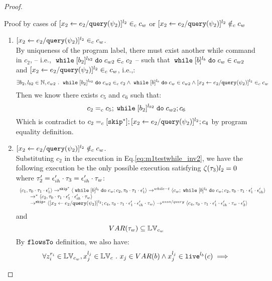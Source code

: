 \begin{proof}
\begin{case}
\begin{subcase}
\begin{subsubcase}
\begin{subproof}
%
Proof by cases of $[\mathrel{ {x}_2 \leftarrow e_2 / {\tt query}(\psi_2) }]^{l_2} \in_c c_w$ or 
$[\mathrel{ {x}_2 \leftarrow e_2 / {\tt query}(\psi_2) }]^{l_2} \notin_c c_w$
\begin{enumerate}
  \item $[\mathrel{ {x}_2 \leftarrow e_2 / {\tt query}(\psi_2) }]^{l_2} \in_c c_w$.
  \\
  By uniqueness of the program label, there must exist another while command in $c_2$, -- i.e., $\;\mathtt{while}\; [b_2]^{l_{b2}} \;\mathtt{do}\; c_{w2} \in_c c_2$ --
    such that 
  $\;\mathtt{while}\; [b]^{l_b} \;\mathtt{do}\; c_w \in c_{w2}$ and $[\mathrel{ {x}_2 \leftarrow e_2 / {\tt query}(\psi_2) }]^{l_2} \in_c c_w$, i.e.,:
  \[
  \exists b_2, l_{b2} \in \mathbb{N}, c_{w2} ~.~ 
  \;\mathtt{while}\; [b_2]^{l_{b2}} \;\mathtt{do}\; c_{w2} \in_c c_2 
  \land \;\mathtt{while}\; [b]^{l_b} \;\mathtt{do}\; c_w \in c_{w2}
  \land [\mathrel{ {x}_2 \leftarrow e_2 / {\tt query}(\psi_2) }]^{l_2} \in_c c_w
  \]
%
Then we know there exists $c_5$ and $c_6$ such that:
\[
  c_2 =_c c_5; \;\mathtt{while}\; [b_2]^{l_{b2}} \;\mathtt{do}\; c_{w2};c_6
\]
Which is contradict to $c_2 =_c [\mathtt{skip}^*];[\mathrel{ {x}_2 \leftarrow e_2 / {\tt query}(\psi_2) }]^{l_2};{c}_4$ by program equality definition.
%
%
 \item $[\mathrel{ {x}_2 \leftarrow e_2 / {\tt query}(\psi_2) }]^{l_2} \notin_c c_w$.
%
\\
%
Substituting $c_2$ in the execution in Eq.\ref{eq:m1testwhile_inv2}, we have the following execution be the only possible execution satisfying $\mathtt{\zeta}(\mathtt{\tau}_3) l_2 = 0$ where $\mathtt{\tau}_2' = \mathtt{\epsilon}_{ih}' \cdot \mathtt{\tau}_3 = \mathtt{\epsilon}_{ih}' \cdot \mathtt{\tau}_w$:
\[
    \begin{array}{l}   
  \langle c_1, \mathtt{\tau}_0 \cdot \mathtt{\tau}_1 \cdot \mathtt{\epsilon}_1' \rangle 
  \rightarrow^{\mathtt{skip}^*} 
  \langle \;\mathtt{while}\; [b]^{l_b} \;\mathtt{do}\; c_w;{c}_2, \mathtt{\tau}_0 \cdot \mathtt{\tau}_1 \cdot \mathtt{\epsilon}_1' \rangle 
  \rightarrow^{while-t} 
  \langle c_w;\;\mathtt{while}\; [b]^{l_b} \;\mathtt{do}\; c_w;c_2, \mathtt{\tau}_0 \cdot \mathtt{\tau}_1 \cdot \mathtt{\epsilon}_1' \cdot \mathtt{\epsilon}_{ih}' \rangle 
  \\
  \qquad \rightarrow^{*} 
  \langle c_2,\mathtt{\tau}_0 \cdot \mathtt{\tau}_1 \cdot \mathtt{\epsilon}_1' \cdot \mathtt{\epsilon}_{ih}' \cdot \mathtt{\tau}_w \rangle
  \\
  \qquad \rightarrow^{\mathtt{skip}*} 
  \langle [\mathrel{ {x}_2 \leftarrow e_2 / {\tt query}(\psi_2) }]^{l_2};{c}_4, 
  \mathtt{\tau}_0 \cdot \mathtt{\tau}_1 \cdot \mathtt{\epsilon}_1' \cdot \mathtt{\epsilon}_{ih}' \cdot \mathtt{\tau}_w \rangle
  \rightarrow^{assn/query} 
  \langle {c}_4,  \mathtt{\tau}_0 \cdot \mathtt{\tau}_1 \cdot \mathtt{\epsilon}_1' \cdot \mathtt{\epsilon}_{ih}' \cdot \mathtt{\tau}_w \cdot \mathtt{\epsilon}_2' \rangle 
\end{array}
\]
and
\[
  VAR{(\mathtt{\tau}_w)} \subseteq \mathbb{LV}_{c_w}
\]
%
By $\mathtt{flowsTo}$ definition, we also have:
\[
  \forall z_i^{r_i} \in \mathbb{LV}_{c_w},  x_j^{l_j} \in \mathbb{LV}_c ~.~ x_j \in VAR(b) \land x_j^{l_j} \in \mathtt{live}^{l_b}(c) \implies
\]
\end{enumerate}
\end{subproof}
\end{subsubcase}
\end{subcase}
\end{case}
\end{proof}
